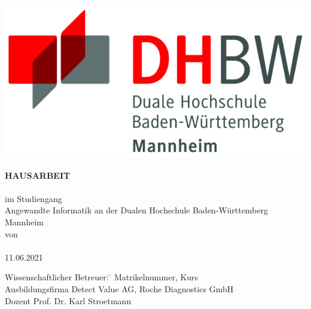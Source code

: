 \begin{titlepage}
\begin{minipage}{\textwidth}
		\vspace{-2cm}
		\noindent \hfill   \includegraphics{img/logo.jpg}
\end{minipage}
\vspace{3.2em}
\sffamily
\begin{center}
	\textsf{\textbf{HAUSARBEIT}}\\[1cm]
    \textsf{\textbf{\large{}\DerTitelDerArbeit}} \\[1cm]
	\textsf{im Studiengang}\\[3mm]
	\textsf{Angewandte Informatik} 
	\textsf{an der Dualen Hochschule Baden-Württemberg Mannheim} \\[0.7cm]
	\textsf{von}\\[5mm]
	\textsf{\DerAutorDerArbeit} \\[0.6cm]
	\textsf{11.06.2021} \\[0.8cm]
\vfill


\begin{minipage}{\textwidth}

\begin{tabbing}
	Wissenschaftlicher Betreuer: \hspace{0.6cm}\=\kill
	Matrikelnummer, Kurs \>\DieMatrikelnummer \DieKursbezeichnung \\[3mm]
	Ausbildungsfirma \>Detect Value AG, Roche Diagnostics GmbH \\[3mm] 
	Dozent \> Prof. Dr. Karl Stroetmann \\[3mm]
\end{tabbing}
\end{minipage}

\end{center}

\end{titlepage}